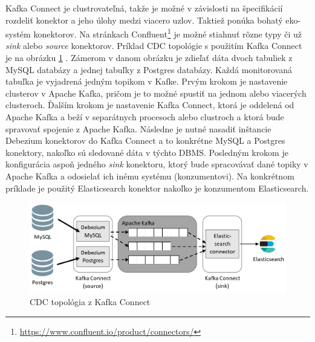 Kafka Connect je clustrovateľná, takže je možné v závislosti na špecifikácií rozdeliť konektor a jeho úlohy medzi viacero uzlov. Taktiež ponúka bohatý eko-systém konektorov. Na stránkach Confluent\footnote{\url{https://www.confluent.io/product/connectors/}} je možné stiahnuť rôzne typy či už \textit{sink} alebo \textit{source} konektorov.
Príklad CDC topológie s použitím Kafka Connect je na obrázku \ref{fig:CDC_topology} \cite{debezium:devoxx}. Zámerom v danom obrázku je zdieľať dáta dvoch tabuliek z MySQL databázy a jednej tabuľky z Postgres databázy. Každá monitorovaná tabuľka je vyjadrená jedným topikom v Kafke. Prvým krokom je nastavenie clusterov v Apache Kafka, pričom je to možné spustiť na jednom alebo viacerých clusteroch. Ďalším krokom je nastavenie Kafka Connect, ktorá je oddelená od Apache Kafka a beží v separátnych procesoch alebo clustroch a ktorá bude spravovať spojenie z Apache Kafka. Následne je nutné nasadiť inštancie Debezium konektorov do Kafka Connect a to konkrétne MySQL a Postgres konektory, nakoľko sú sledované dáta v týchto DBMS. Posledným krokom je konfigurácia aspoň jedného \textit{sink} konektoru, ktorý bude spracovávať dané topiky v Apache Kafka a odosielať ich inému systému (konzumentovi). Na konkrétnom príklade je použitý Elasticsearch konektor nakoľko je konzumentom Elasticsearch.

\begin{figure}[H]
\begin{center}
\includegraphics[width=15cm]{figures/CDC_topology.PNG}
\caption{CDC topológia z Kafka Connect}
\label{fig:CDC_topology}
\end{center}
\end{figure}

